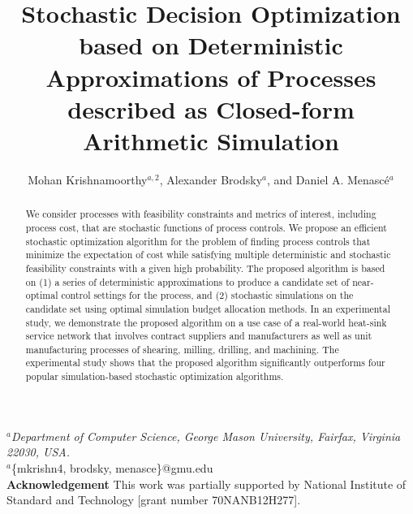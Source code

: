 \documentclass[a4paper, 12pt]{article} %
\title{\textbf{Stochastic Decision Optimization based on Deterministic Approximations of Processes described as Closed-form Arithmetic Simulation }} %
\author{Mohan Krishnamoorthy$^{a,2}$, Alexander Brodsky$^a$, and Daniel A. Menasc\'e$^{a}$} %
\makeatletter
\renewcommand{\maketitle}{ %
\begin{flushleft} 
{\large\@title\footnotemark[1]} %

\vspace{20pt} %

{\large\@author} %
\end{flushleft}
}
\makeatother
\begin{document}
\pagestyle{empty}
\maketitle %

\begin{flushleft} 
\vspace{10pt}
$^a$\textit{Department of Computer Science, George Mason University, Fairfax, Virginia 22030, USA.
}\\
\vspace{20pt}
$^a$\{mkrishn4, brodsky, menasce\}@gmu.edu \\
\vspace{20pt}
\textbf{Acknowledgement}\newline
This work was partially supported by National Institute of Standard and Technology [grant number 70NANB12H277]. \newline
\vspace{20pt}

\end{flushleft} 

\newpage
\pagestyle{plain}
\setcounter{page}{1}
\noindent{\large \@title }
\vspace{10pt}


\begin{abstract}{\small\noindent
We consider processes with feasibility constraints and metrics of interest, including process cost, that are stochastic functions of process controls. We propose an efficient stochastic optimization algorithm for the problem of finding process controls that minimize the expectation of cost while satisfying multiple deterministic and stochastic feasibility constraints with a given high probability. The proposed algorithm is based on (1) a series of deterministic approximations to produce a candidate set of near-optimal control settings for the process, and (2) stochastic simulations on the candidate set using optimal simulation budget allocation methods. In an experimental study, we demonstrate the proposed algorithm on a use case of a real-world heat-sink service network that involves contract suppliers and manufacturers as well as unit manufacturing processes of shearing, milling, drilling, and machining. The experimental study shows that the proposed algorithm significantly outperforms four popular simulation-based stochastic optimization algorithms.
}
\end{abstract}
\end{document}
